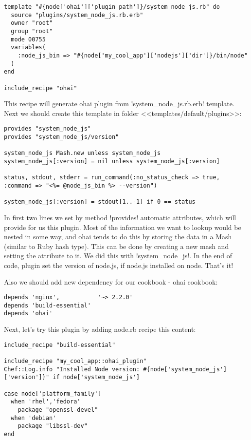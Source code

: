 \begin{lstlisting}[label=lst:cookbook-ohai-recipe1,title=my-server-cloud/site-cookbooks/my\_cool\_app/recipe/ohai\_plugin.rb]
template "#{node['ohai']['plugin_path']}/system_node_js.rb" do
  source "plugins/system_node_js.rb.erb"
  owner "root"
  group "root"
  mode 00755
  variables(
    :node_js_bin => "#{node['my_cool_app']['nodejs']['dir']}/bin/node"
  )
end

include_recipe "ohai"
\end{lstlisting}

This recipe will generate ohai plugin from \inline!system_node_js.rb.erb! template. Next we should create this template in folder <<templates/default/plugins>>:

\begin{lstlisting}[label=lst:cookbook-ohai-template1,title=my-server-cloud/site-cookbooks/my\_cool\_app/templates/default/plugin/system\_node\_js.rb.erb]
provides "system_node_js"
provides "system_node_js/version"

system_node_js Mash.new unless system_node_js
system_node_js[:version] = nil unless system_node_js[:version]

status, stdout, stderr = run_command(:no_status_check => true, :command => "<%= @node_js_bin %> --version")

system_node_js[:version] = stdout[1..-1] if 0 == status
\end{lstlisting}

In first two lines we set by method \inline!provides! automatic attributes, which will provide for us this plugin.
Most of the information we want to lookup would be nested in some way, and ohai tends to do this by storing the data in a Mash (similar to Ruby hash type). This can be done by creating a new mash and setting the attribute to it. We did this with \inline!system_node_js!. In the end of code, plugin set the version of node.js, if node.js installed on node. That's it!

Also we should add new dependency for our cookbook - ohai cookbook:

\begin{lstlisting}[label=lst:cookbook-ohai5]
depends 'nginx',           '~> 2.2.0'
depends 'build-essential'
depends 'ohai'
\end{lstlisting}

Next, let's try this plugin by adding node.rb recipe this content:

\begin{lstlisting}[label=lst:cookbook-ohai6]
include_recipe "build-essential"

include_recipe "my_cool_app::ohai_plugin"
Chef::Log.info "Installed Node version: #{node['system_node_js']['version']}" if node['system_node_js']

case node['platform_family']
  when 'rhel','fedora'
    package "openssl-devel"
  when 'debian'
    package "libssl-dev"
end
\end{lstlisting}

